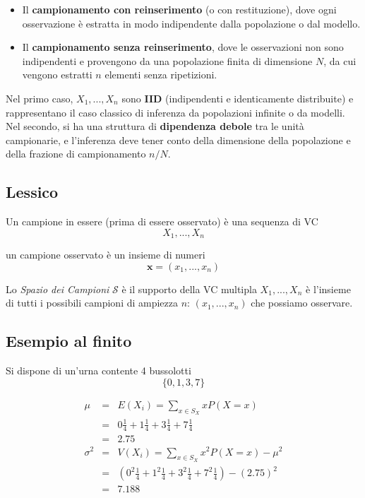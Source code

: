 \documentclass[
  11pt,
]{book}
\providecommand{\tightlist}{%
  \setlength{\itemsep}{0pt}\setlength{\parskip}{0pt}}
\theoremstyle{mytheoremstyle}
\theoremstyle{mydefstyle}
\begin{document}
\begin{itemize}
\tightlist
\item
  Il \textbf{campionamento con reinserimento} (o con restituzione), dove ogni osservazione è estratta in modo indipendente dalla popolazione o dal modello.
\item
  Il \textbf{campionamento senza reinserimento}, dove le osservazioni non sono indipendenti e provengono da una popolazione finita di dimensione \(N\), da cui vengono estratti \(n\) elementi senza ripetizioni.
\end{itemize}

Nel primo caso, \(X_1, ..., X_n\) sono \textbf{IID} (indipendenti e identicamente distribuite) e rappresentano il caso classico di inferenza da popolazioni infinite o da modelli. Nel secondo, si ha una struttura di \textbf{dipendenza debole} tra le unità campionarie, e l'inferenza deve tener conto della dimensione della popolazione e della frazione di campionamento \(n/N\).

\subsection{Lessico}\label{lessico}

Un campione in essere (prima di essere osservato) è una sequenza di VC
\[X_1,...,X_n\]

un campione osservato è un insieme di numeri
\[\mathbf{x}=(x_1,...,x_n)\]

Lo \emph{Spazio dei Campioni} \(\mathcal{S}\) è il supporto della VC multipla \(X_1,...,X_n\)
è l'insieme di tutti i possibili campioni di ampiezza \(n\): \((x_1,...,x_n)\) che possiamo osservare.

\subsection{Esempio al finito}\label{esempio-al-finito}

Si dispone di un'urna contente 4 bussolotti
\[\{0,1,3,7\}\]

\begin{eqnarray*} \mu &=& E(X_i) = \sum_{x\in S_X}x P(X=x)\\ 
 &=&  0  \frac { 1 }{ 4 }+ 1  \frac { 1 }{ 4 }+ 3  \frac { 1 }{ 4 }+ 7  \frac { 1 }{ 4 } \\ 
            &=& 2.75 \\ 
 \sigma^2 &=& V(X_i) = \sum_{x\in S_X}x^2 P(X=x)-\mu^2\\ 
 &=&\left(  0  ^2\frac { 1 }{ 4 }+ 1  ^2\frac { 1 }{ 4 }+ 3  ^2\frac { 1 }{ 4 }+ 7  ^2\frac { 1 }{ 4 } \right)-( 2.75 )^2\\ 
            &=& 7.188 
\end{eqnarray*}
\end{document}
